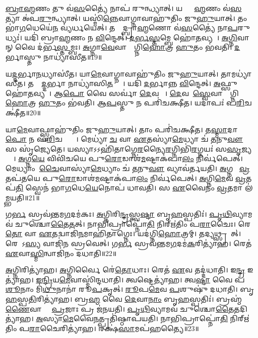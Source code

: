 \ul{𑌬𑍍𑌰𑌾}\ul{𑌹𑍍𑌮}𑌣𑌂 𑌤𑍁 𑌵॑\ul{𑌸}𑌤𑍍𑌯𑍈॑ 𑌨𑌾𑌪॑ 𑌰𑍁𑌨𑍍𑌧𑍍𑌯𑌾𑌤𑍍।
𑌯𑌦𑍍𑌬𑍍𑌰𑌾᳚\ul{𑌹𑍍𑌮}𑌣𑌂 𑌵॑\ul{𑌸}𑌤𑍍𑌯𑌾 𑌅॑𑌪\ul{𑌰𑍁}𑌨𑍍𑌧𑍍𑌯𑌾𑌤𑍍।
𑌯𑌸𑍍𑌮𑌿॑\ul{𑌨𑍍𑌨𑍇}𑌵𑌾𑌗𑍍𑌨𑌾𑌵𑌾𑌹𑍁॑𑌤𑌿𑌂 𑌜𑍁\ul{𑌹𑍁}𑌯𑌾𑌤𑍍।
𑌤𑌂 𑌭𑌾॑\ul{𑌗}𑌧𑍇𑌯𑍇॑\ul{𑌨} 𑌵𑍍𑌯॑𑌰𑍍𑌧𑌯𑍇𑌤𑍍।
𑌤𑌸𑍍𑌮𑌾᳚𑌦𑍍𑌬𑍍𑌰𑌾\ul{𑌹𑍍𑌮}𑌣𑍋 𑌵॑\ul{𑌸}𑌤𑍍𑌯𑍈॑ 𑌨𑌾\ul{𑌪}𑌰𑍁𑌧𑍍𑌯𑌃॑।
𑌯𑌦𑌿॑ 𑌬𑍍𑌰𑌾\ul{𑌹𑍍𑌮}𑌣𑌂 𑌨 \ul{𑌵𑌿}𑌨𑍍𑌦𑍇𑌤𑍍।
\ul{𑌦}\ul{𑌰𑍍𑌭}\ul{𑌸𑍍𑌤}𑌮𑍍𑌬𑍇 𑌹𑍋॑\ul{𑌤}𑌵𑍍𑌯𑌮𑍍᳚।
\ul{𑌅}\ul{𑌗𑍍𑌨𑌿}𑌵𑌾𑌨𑍍 𑌵𑍈 𑌦॑𑌰𑍍𑌭\ul{𑌸𑍍𑌤}𑌮𑍍𑌬𑌃।
\ul{𑌅}𑌗𑍍𑌨𑌾\ul{𑌵𑍇}𑌵𑌾𑌸𑍍𑌯𑌾᳚𑌗𑍍𑌨𑌿\ul{𑌹𑍋}𑌤𑍍𑌰 \ul{𑌹𑍁}𑌤𑌂 𑌭॑𑌵𑌤𑌿।
\ul{𑌦}𑌰𑍍𑌭𑌾𑌸𑍍𑌤𑍁 𑌨𑌾𑌧𑍍𑌯𑌾॑𑌸𑍀𑌤॥19॥

𑌯\ul{𑌦𑍍𑌦}𑌰𑍍𑌭𑌾\ul{𑌨}𑌧𑍍𑌯𑌾𑌸𑍀॑𑌤।
𑌯𑌾\ul{𑌮𑍇}𑌵𑌾𑌗𑍍𑌨𑌾𑌵𑌾𑌹𑍁॑𑌤𑌿𑌂 𑌜𑍁\ul{𑌹𑍁}𑌯𑌾𑌤𑍍।
𑌤𑌾𑌮𑌧𑍍𑌯𑌾॑𑌸𑍀𑌤।
𑌤𑌸𑍍𑌮𑌾᳚\ul{𑌦𑍍𑌦}𑌰𑍍𑌭𑌾 𑌨𑌾𑌧𑍍𑌯𑌾॑𑌸𑌿\ul{𑌤}𑌵𑍍𑌯𑌾𑌃᳚।
𑌯𑌦𑌿॑ \ul{𑌦}𑌰𑍍𑌭𑌾𑌨𑍍𑌨 \ul{𑌵𑌿}𑌨𑍍𑌦𑍇𑌤𑍍।
\ul{𑌅}𑌫𑍍𑌸𑍁 𑌹𑍋॑\ul{𑌤}𑌵𑍍𑌯𑌮𑍍᳚।
𑌆\ul{𑌪𑍋} 𑌵𑍈 𑌸𑌰𑍍𑌵𑌾॑ \ul{𑌦𑍇}𑌵𑌤𑌾𑌃᳚।
\ul{𑌦𑍇}𑌵𑌤𑌾᳚\ul{𑌸𑍍𑌵𑍇}𑌵𑌾𑌸𑍍𑌯𑌾᳚𑌗𑍍𑌨𑌿\ul{𑌹𑍋}𑌤𑍍𑌰 \ul{𑌹𑍁}𑌤𑌂 𑌭॑𑌵𑌤𑌿।
𑌆\ul{𑌪}𑌸𑍍𑌤𑍁 𑌨 𑌪𑌰𑌿॑𑌚𑌕𑍍𑌷𑍀𑌤।
𑌯𑌦𑌾𑌪𑌃॑ 𑌪\ul{𑌰𑌿}𑌚𑌕𑍍𑌷𑍀॑𑌤॥20॥

𑌯𑌾\ul{𑌮𑍇}𑌵𑌾𑌫𑍍𑌸𑍍𑌵𑌾𑌹𑍁॑𑌤𑌿𑌂 𑌜𑍁\ul{𑌹𑍁}𑌯𑌾𑌤𑍍।
𑌤𑌾𑌂 𑌪𑌰𑌿॑𑌚𑌕𑍍𑌷𑍀𑌤।
𑌤\ul{𑌸𑍍𑌮𑌾}𑌦𑌾\ul{𑌪𑍋} 𑌨 𑌪॑\ul{𑌰𑌿}𑌚𑌕𑍍𑌷𑍍𑌯𑌾𑌃᳚।
𑌮𑍇𑌧𑍍𑌯𑌾॑ \ul{𑌚} 𑌵𑌾 \ul{𑌏}𑌤𑌸𑍍𑌯𑌾॑\ul{𑌮𑍇}𑌧𑍍𑌯𑌾 𑌚॑ \ul{𑌤}𑌨𑍁\ul{𑌵𑍗} 𑌸 𑌸𑍃॑𑌜𑍍𑌯𑍇𑌤𑍇।
𑌯𑌸𑍍𑌯𑌾𑌽𑌽𑌹𑌿॑𑌤𑌾𑌗𑍍𑌨𑍇\ul{𑌰}𑌨𑍍𑌯𑍈\ul{𑌰}𑌗𑍍𑌨𑌿𑌭𑌿॑\ul{𑌰}𑌗𑍍𑌨𑌯𑌃॑ 𑌸\ul{𑌸𑍃}𑌜𑍍𑌯𑌨𑍍𑌤𑍇᳚।
\ul{𑌅}𑌗𑍍𑌨\ul{𑌯𑍇} 𑌵𑌿𑌵𑌿॑𑌚𑌯𑍇 𑌪𑍁\ul{𑌰𑍋}𑌡𑌾𑌶॑\ul{𑌮}𑌷𑍍𑌟𑌾𑌕॑𑌪𑌾\ul{𑌲𑌂} 𑌨𑌿𑌰𑍍𑌵॑𑌪𑍇𑌤𑍍।
𑌮𑍇𑌧𑍍𑌯𑌾𑌂 \ul{𑌚𑍈}𑌵𑌾𑌸𑍍𑌯𑌾॑\ul{𑌮𑍇}𑌧𑍍𑌯𑌾𑌂 𑌚॑ \ul{𑌤}𑌨𑍁\ul{𑌵𑍗} 𑌵𑍍𑌯𑌾𑌵॑𑌰𑍍𑌤𑌯𑌤𑌿।
\ul{𑌅}𑌗𑍍𑌨𑌯𑍇᳚ \ul{𑌵𑍍𑌰}𑌤𑌪॑𑌤𑌯𑍇 𑌪𑍁\ul{𑌰𑍋}𑌡𑌾𑌶॑\ul{𑌮}𑌷𑍍𑌟𑌾𑌕॑𑌪𑌾\ul{𑌲𑌂} 𑌨𑌿𑌰𑍍𑌵॑𑌪𑍇𑌤𑍍।
\ul{𑌅}𑌗𑍍𑌨𑌿\ul{𑌮𑍇}𑌵 \ul{𑌵𑍍𑌰}𑌤𑌪॑\ul{𑌤𑌿}\ul{} 𑌸𑍍𑌵𑍇𑌨॑ 𑌭𑌾\ul{𑌗}𑌧𑍇\ul{𑌯𑍇}𑌨𑍋𑌪॑ 𑌧𑌾𑌵𑌤𑌿।
𑌸 \ul{𑌏}𑌵𑍈𑌨𑌂॑ \ul{𑌵𑍍𑌰}𑌤𑌮𑌾 𑌲॑𑌮𑍍𑌭𑌯𑌤𑌿॥21॥

𑌗\ul{𑌰𑍍𑌭}\ul{} 𑌸𑍍𑌰𑌵॑𑌨𑍍𑌤𑌮\ul{𑌗}𑌦𑌮॑𑌕𑌃।
\ul{𑌅}𑌗𑍍𑌨𑌿𑌰𑌿\ul{𑌨𑍍𑌦𑍍𑌰}𑌸𑍍𑌤𑍍𑌵\ul{𑌷𑍍𑌟𑌾} 𑌬𑍃\ul{𑌹}𑌸𑍍𑌪𑌤𑌿𑌃॑।
\ul{𑌪𑍃}\ul{𑌥𑌿}𑌵𑍍𑌯𑌾𑌮𑌵॑ 𑌚𑍁𑌶𑍍𑌚𑍋\ul{𑌤𑍈}𑌤𑌤𑍍।
𑌨𑌾𑌭𑌿𑌪𑍍𑌰𑌾𑌪𑍍𑌨𑍋॑\ul{𑌤𑌿} 𑌨𑌿𑌰𑍍‌\mbox{}𑌋॑𑌤𑌿𑌂 𑌪\ul{𑌰𑌾}𑌚𑍈𑌃।
𑌰𑍇\ul{𑌤𑍋} 𑌵𑌾 \ul{𑌏}𑌤𑌦𑍍𑌵𑌾𑌜𑌿॑\ul{𑌨}𑌮𑌾𑌹𑌿॑𑌤𑌾𑌗𑍍𑌨𑍇𑌃।
𑌯𑌦॑𑌗𑍍𑌨𑌿\ul{𑌹𑍋}𑌤𑍍𑌰𑌮𑍍।
𑌤𑌦𑍍𑌯𑌥𑍍𑌸𑍍𑌰𑌵𑍇᳚𑌤𑍍।
𑌰𑍇𑌤𑍋᳚\-𑌽\ul{𑌸𑍍𑌯} 𑌵𑌾𑌜𑌿॑𑌨 𑌸𑍍𑌰𑌵𑍇𑌤𑍍।
𑌗\ul{𑌰𑍍𑌭}\ul{} 𑌸𑍍𑌰𑌵॑𑌨𑍍𑌤𑌮\ul{𑌗}𑌦𑌮॑\ul{𑌕}𑌰𑌿𑌤𑍍𑌯𑌾॑𑌹।
𑌰𑍇𑌤॑ \ul{𑌏}𑌵𑌾\ul{𑌸𑍍𑌮𑌿}𑌨𑍍𑌵𑌾𑌜𑌿॑𑌨𑌂 𑌦𑌧𑌾𑌤𑌿॥22॥

\ul{𑌅}𑌗𑍍𑌨𑌿𑌰𑌿𑌤𑍍𑌯𑌾॑𑌹।
\ul{𑌅}𑌗𑍍𑌨𑌿𑌰𑍍𑌵𑍈 𑌰𑍇॑\ul{𑌤𑍋}𑌧𑌾𑌃।
𑌰𑍇𑌤॑ \ul{𑌏}𑌵 𑌤𑌦𑍍𑌦॑𑌧𑌾𑌤𑌿।
𑌇\ul{𑌨𑍍𑌦𑍍𑌰} 𑌇𑌤𑍍𑌯𑌾॑𑌹।
\ul{𑌇}\ul{𑌨𑍍𑌦𑍍𑌰𑌿}𑌯\ul{𑌮𑍇}𑌵𑌾𑌸𑍍𑌮𑌿॑𑌨𑍍𑌦𑌧𑌾𑌤𑌿।
𑌤𑍍𑌵𑌷𑍍𑌟𑍇𑌤𑍍𑌯𑌾॑𑌹।
𑌤𑍍𑌵\ul{𑌷𑍍𑌟𑌾} 𑌵𑍈 𑌪॑\ul{𑌶𑍂}𑌨𑌾𑌂 𑌮𑌿॑\ul{𑌥𑍁}𑌨𑌾𑌨𑌾॑ 𑌰𑍂\ul{𑌪}𑌕𑍃𑌤𑍍।
\ul{𑌰𑍂}𑌪\ul{𑌮𑍇}𑌵 \ul{𑌪}𑌶𑍁𑌷𑍁॑ 𑌦𑌧𑌾𑌤𑌿।
𑌬𑍃\ul{𑌹}𑌸𑍍𑌪\ul{𑌤𑌿}𑌰𑌿𑌤𑍍𑌯𑌾॑𑌹।
𑌬𑍍𑌰\ul{𑌹𑍍𑌮} 𑌵𑍈 \ul{𑌦𑍇}𑌵𑌾\ul{𑌨𑌾𑌂} 𑌬𑍃\ul{𑌹}𑌸𑍍𑌪𑌤𑌿𑌃॑।
𑌬𑍍𑌰𑌹𑍍𑌮॑\ul{𑌣𑍈}𑌵𑌾𑌸𑍍𑌮𑍈᳚ \ul{𑌪𑍍𑌰}𑌜𑌾𑌃 𑌪𑍍𑌰 𑌜॑𑌨𑌯𑌤𑌿।
\ul{𑌪𑍃}\ul{𑌥𑌿}𑌵𑍍𑌯𑌾𑌮𑌵॑ 𑌚𑍁𑌶𑍍𑌚𑍋\ul{𑌤𑍈}𑌤𑌦𑌿𑌤𑍍𑌯𑌾॑𑌹।
\ul{𑌅}𑌸𑍍𑌯𑌾\ul{𑌮𑍇}𑌵𑍈\ul{𑌨}𑌤𑍍𑌪𑍍𑌰𑌤𑌿॑\-𑌷𑍍𑌠𑌾𑌪𑌯𑌤𑌿।
𑌨𑌾𑌭𑌿𑌪𑍍𑌰𑌾𑌪𑍍𑌨𑍋॑\ul{𑌤𑌿} 𑌨𑌿𑌰𑍍‌\mbox{}𑌋॑𑌤𑌿𑌂 𑌪\ul{𑌰𑌾}𑌚𑍈𑌰𑌿𑌤𑍍𑌯𑌾॑𑌹।
𑌰𑌕𑍍𑌷॑\ul{𑌸𑌾}𑌮𑌪॑𑌹𑌤𑍍𑌯𑍈॥23॥

